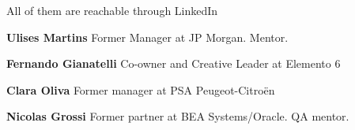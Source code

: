 
\begin{cvparagraph}
	All of them are reachable through LinkedIn

	\textbf{Ulises Martins}
	Former Manager at JP Morgan. Mentor.

	\textbf{Fernando Gianatelli}
	Co-owner and Creative Leader at Elemento 6

	\textbf{Clara Oliva}
	Former manager at PSA Peugeot-Citroën

	\textbf{Nicolas Grossi}
	Former partner at BEA Systems/Oracle. QA mentor.
\end{cvparagraph}
